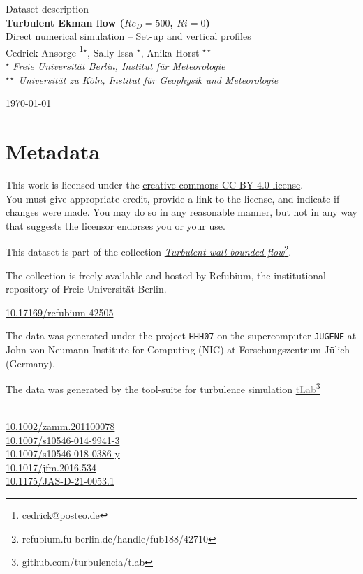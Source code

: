 \documentclass[11pt]{article}
\date{\nodate}
\makeatletter
\newcommand{\dstitle}{Turbulent Ekman flow ($Re_D=500$, $Ri=0$)}
\newcommand{\subtitle}{Direct numerical simulation -- Set-up and vertical profiles}
\newcommand{\doi}{10.17169/refubium-42505}
\newcommand{\tlabName}{\textcolor{gray}{tLab}}
\newcommand{\authors}{
    Cedrick Ansorge \footnote{\href{mailto:cedrick@posteo.de}{cedrick@posteo.de}}$^\star$, \hspace{0.05cm}  
    Sally Issa $^\star$\hspace{0.05cm},
    Anika Horst $^{\star\star}$ \\[0.5em]
    {\small \light{$^\star$ \emph{ Freie Universit\"at Berlin, Institut f\"ur Meteorologie} \\
    $^{\star\star}$ \emph{Universit\"at zu K\"oln, Institut f\"ur Geophysik und Meteorologie}}}
}
\newcommand{\light}[1]{\textcolor{black!80}{#1}}
\newcommand{\printdoi}[1]{\href{https://dx.doi.org/#1}{#1}}
\makeatother
\begin{document}
{ \selectfont
\begin{centering}

 \light{\large Dataset description} \\[1em] 
 {\LARGE \bfseries \sffamily\dstitle} \\[1em]
 \light{\large\subtitle} \\[1em]
 \authors\\ 
\end{centering}
\light{\hfill \today}
}


\section{Metadata}
\begin{description}
\sffamily
\item[\textcopyright] This work is licensed under the \href{https://creativecommons.org/licenses/by/4.0}{creative commons CC BY 4.0 license}. \\ {\small\light{You must give appropriate credit, provide a link to the license, and indicate if changes were made. You may do so in any reasonable manner, but not in any way that suggests the licensor endorses you or your use. }}
\item[\sffamily Collection] This dataset is part of the collection \href{https://refubium.fu-berlin.de/handle/fub188/42710}{\emph{Turbulent wall-bounded flow}\footnote{\url{refubium.fu-berlin.de/handle/fub188/42710}}}.

{\small \light{The collection is freely available and hosted by Refubium, the  institutional repository of Freie Universit\"at Berlin.}}

\item[\sffamily DOI]\printdoi{\doi}
\item[\sffamily HPC systems] The data was generated under the project \texttt{HHH07} on the supercomputer \texttt{JUGENE} at John-von-Neumann Institute for Computing (NIC) at Forschungszentrum J\"ulich (Germany). 
\item[\sffamily Code] The data was generated by the tool-suite for turbulence simulation \href{https://github.com/turbulencia/tlab}{\tlabName\footnote{\url{github.com/turbulencia/tlab}}}

\item[\sffamily Related Publications] ~\\
    \printdoi{10.1002/zamm.201100078} \\
    \printdoi{10.1007/s10546-014-9941-3} \\
    \printdoi{10.1007/s10546-018-0386-y} \\
    \printdoi{10.1017/jfm.2016.534} \\
    \printdoi{10.1175/JAS-D-21-0053.1}\\

\end{description}
\end{document}
